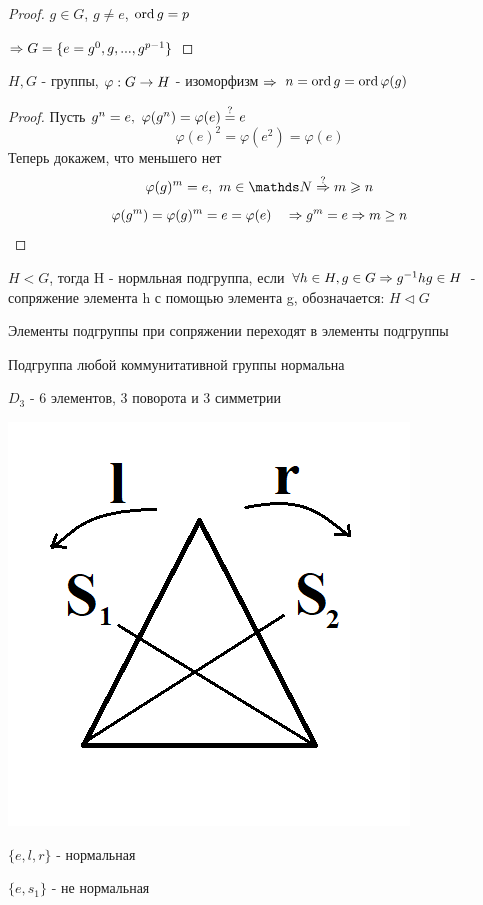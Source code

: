 \documentclass[12pt, fleqn]{article}
\begin{document}
\begin{proof}
    $g \in G$, $g \neq e$, $\mathop{\rm ord}\nolimits g=p$
    
    $\Rightarrow G=\{e=g^0,g,...,g^{p-1}\}$
\end{proof}

\begin{utv}
    $H,G$ - группы, $\varphi: G \rightarrow H$ - изоморфизм $\Rightarrow$ $n=\mathop{\rm ord}\nolimits g=\mathop{\rm ord}\nolimits \varphi(g)$
\end{utv}

\begin{proof}
    Пусть $g^n=e,\ \varphi(g^n)=\varphi(e)\os{?}{=}e$
    \[\varphi(e)^2=\varphi(e^2)=\varphi(e)\]
    Теперь докажем, что меньшего нет
    \[\varphi(g)^m = e,\ m \in \N \os{?}{\Ra} m \geqslant n\]
	\[\varphi(g^m) = \varphi(g)^m = e = \varphi(e) \quad \Rightarrow g^m = e \Rightarrow m \geq n\]
\end{proof}

\begin{definition}
    $H<G$, тогда H - нормльная подгруппа, если $\forall h \in H, g \in G \Rightarrow g^{-1}h g \in H$ - сопряжение элемента h с помощью элемента g, обозначается: $H \triangleleft G$
\end{definition}

\begin{remark}
    Элементы подгруппы при сопряжении переходят в элементы подгруппы
\end{remark}

\begin{remark}
    Подгруппа любой коммунитативной группы нормальна
\end{remark}

\begin{example}
    $D_3$ - 6 элементов, 3 поворота и 3 симметрии
    
    \includegraphics[scale=0.3]{pics/triangle_d_3.png}
    
    $\{e,l,r\}$ - нормальная
    
    $\{e, s_1\}$ - не нормальная
\end{example}
\end{document}
